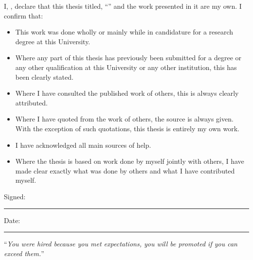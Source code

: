 \documentclass[
11pt, %
english, %
singlespacing, %
headsepline, %
]{MastersDoctoralThesis} %
\theoremstyle{assumption}
\theoremstyle{definition}
\theoremstyle{proposition}
\begin{document}

\begin{declaration}
\addchaptertocentry{\authorshipname} %
\noindent I, \authorname, declare that this thesis titled, \enquote{\ttitle} and the work presented in it are my own. I confirm that:

\begin{itemize} 
\item This work was done wholly or mainly while in candidature for a research degree at this University.
\item Where any part of this thesis has previously been submitted for a degree or any other qualification at this University or any other institution, this has been clearly stated.
\item Where I have consulted the published work of others, this is always clearly attributed.
\item Where I have quoted from the work of others, the source is always given. With the exception of such quotations, this thesis is entirely my own work.
\item I have acknowledged all main sources of help.
\item Where the thesis is based on work done by myself jointly with others, I have made clear exactly what was done by others and what I have contributed myself.\\
\end{itemize}
 
\noindent Signed:\\
\rule[0.5em]{25em}{0.5pt} %
 
\noindent Date:\\
\rule[0.5em]{25em}{0.5pt} %
\end{declaration}

\cleardoublepage


\vspace*{0.2\textheight}

\noindent\enquote{\itshape You were hired because you met expectations, you will be promoted if you can exceed them.}\bigbreak
\end{document}

